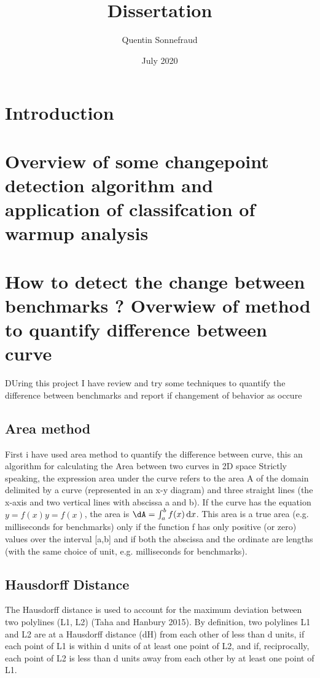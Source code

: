 \documentclass{article}
\title{Dissertation}
\author{Quentin Sonnefraud}
\date{July 2020}
\begin{document}
\maketitle


\section{Introduction}

\section{Overview of some changepoint detection algorithm and application of classifcation of warmup analysis}

\section{ How to detect the change between benchmarks ? Overwiew of method to quantify difference between curve}

DUring this project I have review and try some techniques to quantify the difference between benchmarks and report if changement of behavior as occure

\subsection{Area method}

First i have used area method to quantify the difference between curve, this an algorithm for calculating the Area between two curves in 2D space
Strictly speaking, the expression area under the curve refers to the area A of the domain delimited by a curve (represented in an x-y diagram) and three straight lines (the x-axis and two vertical lines with abscissa a and b). If the curve has the equation $y=f(x)y=f(x)$, the area is $\dA=\int _{a}^{b}f(x)\,\mathrm {d} x$. This area is a true area (e.g. milliseconds for benchmarks) only if the function f has only positive (or zero) values over the interval [a,b] and if both the abscissa and the ordinate are lengths (with the same choice of unit, e.g. milliseconds for benchmarks).

\subsection{Hausdorff Distance }

The Hausdorff distance is used to account for the maximum deviation between two polylines (L1, L2) (Taha and Hanbury 2015). By definition, two polylines L1 and L2 are at a Hausdorff distance (dH) from each other of less than d units, if each point of L1 is within d units of at least one point of L2, and if, reciprocally, each point of L2 is less than d units away from each other by at least one
point of L1.
\end{document}
